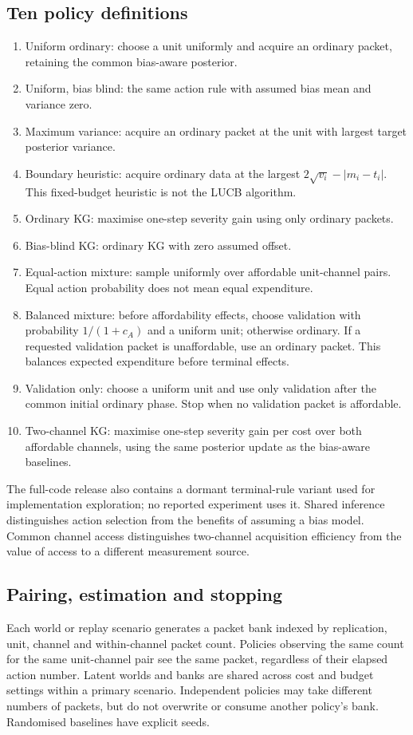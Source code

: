 \subsection{Ten policy definitions}
\begin{enumerate}
\item Uniform ordinary: choose a unit uniformly and acquire an ordinary packet, retaining the common bias-aware posterior.
\item Uniform, bias blind: the same action rule with assumed bias mean and variance zero.
\item Maximum variance: acquire an ordinary packet at the unit with largest target posterior variance.
\item Boundary heuristic: acquire ordinary data at the largest $2\sqrt{v_i}-|m_i-t_i|$. This fixed-budget heuristic is not the LUCB algorithm.
\item Ordinary KG: maximise one-step severity gain using only ordinary packets.
\item Bias-blind KG: ordinary KG with zero assumed offset.
\item Equal-action mixture: sample uniformly over affordable unit-channel pairs. Equal action probability does not mean equal expenditure.
\item Balanced mixture: before affordability effects, choose validation with probability $1/(1+c_A)$ and a uniform unit; otherwise ordinary. If a requested validation packet is unaffordable, use an ordinary packet. This balances expected expenditure before terminal effects.
\item Validation only: choose a uniform unit and use only validation after the common initial ordinary phase. Stop when no validation packet is affordable.
\item Two-channel KG: maximise one-step severity gain per cost over both affordable channels, using the same posterior update as the bias-aware baselines.
\end{enumerate}
The full-code release also contains a dormant terminal-rule variant used for implementation exploration; no reported experiment uses it. Shared inference distinguishes action selection from the benefits of assuming a bias model. Common channel access distinguishes two-channel acquisition efficiency from the value of access to a different measurement source.

\subsection{Pairing, estimation and stopping}
Each world or replay scenario generates a packet bank indexed by replication, unit, channel and within-channel packet count. Policies observing the same count for the same unit-channel pair see the same packet, regardless of their elapsed action number. Latent worlds and banks are shared across cost and budget settings within a primary scenario. Independent policies may take different numbers of packets, but do not overwrite or consume another policy's bank. Randomised baselines have explicit seeds.

